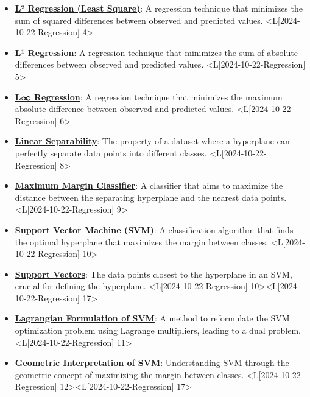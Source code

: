 \documentclass{article}%
\begin{document}
\begin{itemize}[[leftmargin=*]]%
\item \href{https://www.math.purdue.edu/~yipn/421/2024-10-22-Regression.pdf#page=4}{\textbf{L² Regression (Least Square)}}: A regression technique that minimizes the sum of squared differences between observed and predicted values. <L[2024-10-22-Regression] 4>%
\item \href{https://www.math.purdue.edu/~yipn/421/2024-10-22-Regression.pdf#page=5}{\textbf{L¹ Regression}}: A regression technique that minimizes the sum of absolute differences between observed and predicted values. <L[2024-10-22-Regression] 5>%
\item \href{https://www.math.purdue.edu/~yipn/421/2024-10-22-Regression.pdf#page=6}{\textbf{L∞ Regression}}: A regression technique that minimizes the maximum absolute difference between observed and predicted values. <L[2024-10-22-Regression] 6>%
\item \href{https://www.math.purdue.edu/~yipn/421/2024-10-22-Regression.pdf#page=8}{\textbf{Linear Separability}}: The property of a dataset where a hyperplane can perfectly separate data points into different classes. <L[2024-10-22-Regression] 8>%
\item \href{https://www.math.purdue.edu/~yipn/421/2024-10-22-Regression.pdf#page=9}{\textbf{Maximum Margin Classifier}}: A classifier that aims to maximize the distance between the separating hyperplane and the nearest data points. <L[2024-10-22-Regression] 9>%
\item \href{https://www.math.purdue.edu/~yipn/421/2024-10-22-Regression.pdf#page=10}{\textbf{Support Vector Machine (SVM)}}: A classification algorithm that finds the optimal hyperplane that maximizes the margin between classes. <L[2024-10-22-Regression] 10>%
\item \href{https://www.math.purdue.edu/~yipn/421/2024-10-22-Regression.pdf#page=10}{\textbf{Support Vectors}}: The data points closest to the hyperplane in an SVM, crucial for defining the hyperplane. <L[2024-10-22-Regression] 10><L[2024-10-22-Regression] 17>%
\item \href{https://www.math.purdue.edu/~yipn/421/2024-10-22-Regression.pdf#page=11}{\textbf{Lagrangian Formulation of SVM}}: A method to reformulate the SVM optimization problem using Lagrange multipliers, leading to a dual problem. <L[2024-10-22-Regression] 11>%
\item \href{https://www.math.purdue.edu/~yipn/421/2024-10-22-Regression.pdf#page=12}{\textbf{Geometric Interpretation of SVM}}: Understanding SVM through the geometric concept of maximizing the margin between classes. <L[2024-10-22-Regression] 12><L[2024-10-22-Regression] 17>%

\end{itemize}
\end{document}
